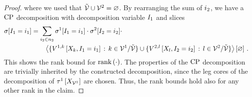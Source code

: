 \begin{proof}
    where we used that $\tilde{\mathcal{V}}\cup\mathcal{V}^{2}=\varnothing$.
    By rearranging the sum of $i_{2}$, we have a $\mathrm{CP}$ decomposition with decomposition variable $I_{1}$ and slices
    \begin{align*}
        \sigma[I_{1}=i_{1}]
        & = \sum_{i_{2}\in n_{2}}  \sigma^{1}[I_{1}=i_{1}] \cdot \sigma^{2}[I_{2}=i_{2}] \cdot \\
        & \quad \quad \left\langle \{V^{1,k}\left[X_{k},I_{1}=i_{1}\right] \, : \, k\in\mathcal{V}^{1}/\tilde{\mathcal{V}}\} \cup \{V^{2,l}\left[X_{l},I_{2}=i_{2}\right] \, : \, l\in\mathcal{V}^{2}/\tilde{\mathcal{V}}\}\right\rangle \left[ \varnothing \right] \, .
    \end{align*}
    This shows the rank bound for $\mathrm{rank}\left(\cdot\right)$.
    The properties of the $\mathrm{CP}$ decomposition are trivially inherited by the constructed decomposition, since the leg cores of the decomposition of $\tau^{1}\left[X_{\mathcal{V}^{1}}\right]$ are chosen.
    Thus, the rank bounds hold also for any other rank in the claim.
\end{proof}

